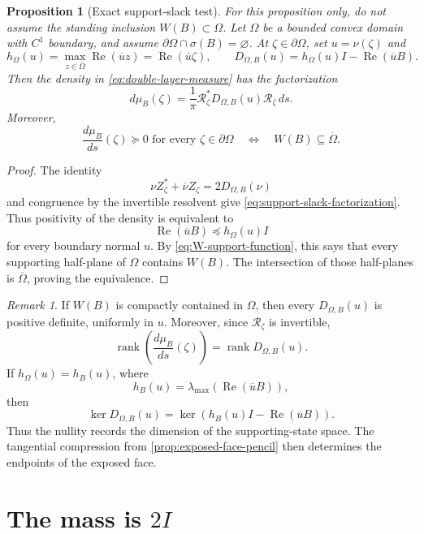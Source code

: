 \documentclass[11pt,oneside,openany]{book}
\newtheorem{proposition}[theorem]{Proposition}
\theoremstyle{definition}
\theoremstyle{remark}
\newtheorem{remark}[theorem]{Remark}
\newcommand{\RePart}{\operatorname{Re}}
\newcommand{\spec}{\sigma}
\newcommand{\rank}{\operatorname{rank}}
\begin{document}
\begin{proposition}[Exact support-slack test]
\label{prop:support-slack-test}
For this proposition only, do not assume the standing inclusion
\(W(B)\subset\Omega\).  Let \(\Omega\) be a bounded convex domain with
\(C^1\) boundary, and assume
\(\partial\Omega\cap\spec(B)=\varnothing\).  At
\(\zeta\in\partial\Omega\), set \(u=\nu(\zeta)\) and
\[
  h_\Omega(u)
  =
  \max_{z\in\overline\Omega}\RePart(\overline uz)
  =
  \RePart(\overline u\zeta),
  \qquad
  D_{\Omega,B}(u)
  =
  h_\Omega(u)I-\RePart(\overline uB).
\]
Then the density in \eqref{eq:double-layer-measure} has the factorization
\begin{equation}
  d\mu_B(\zeta)
  =
  \frac1\pi
  \mathcal R_\zeta^*D_{\Omega,B}(u)\mathcal R_\zeta\,ds.
  \label{eq:support-slack-factorization}
\end{equation}
Moreover,
\[
  \frac{d\mu_B}{ds}(\zeta)\succeq0
  \text{ for every }\zeta\in\partial\Omega
  \quad\Longleftrightarrow\quad
  W(B)\subseteq\overline\Omega.
\]
\end{proposition}

\begin{proof}
The identity
\[
  \nu Z_\zeta^*+\overline\nu Z_\zeta
  =
  2D_{\Omega,B}(\nu)
\]
and congruence by the invertible resolvent give
\eqref{eq:support-slack-factorization}.  Thus positivity of the density
is equivalent to
\[
  \RePart(\overline uB)\preceq h_\Omega(u)I
\]
for every boundary normal \(u\).  By
\eqref{eq:W-support-function}, this says that every supporting
half-plane of \(\Omega\) contains \(W(B)\).  The intersection of those
half-planes is \(\overline\Omega\), proving the equivalence.
\end{proof}

\begin{remark}
If \(W(B)\) is compactly contained in \(\Omega\), then every
\(D_{\Omega,B}(u)\) is positive definite, uniformly in \(u\).
Moreover, since \(\mathcal R_\zeta\) is invertible,
\[
  \rank\left(\frac{d\mu_B}{ds}(\zeta)\right)
  =
  \rank D_{\Omega,B}(u).
\]
If \(h_\Omega(u)=h_B(u)\), where
\[
  h_B(u)
  =
  \lambda_{\max}\left(\RePart(\overline uB)\right),
\]
then
\[
  \ker D_{\Omega,B}(u)
  =
  \ker\left(
    h_B(u)I-\RePart(\overline uB)
  \right).
\]
Thus the nullity records the dimension of the supporting-state space.
The tangential compression from
\cref{prop:exposed-face-pencil} then determines the endpoints of the
exposed face.
\end{remark}

\section{The mass is \texorpdfstring{\(2I\)}{2I}}
\end{document}
